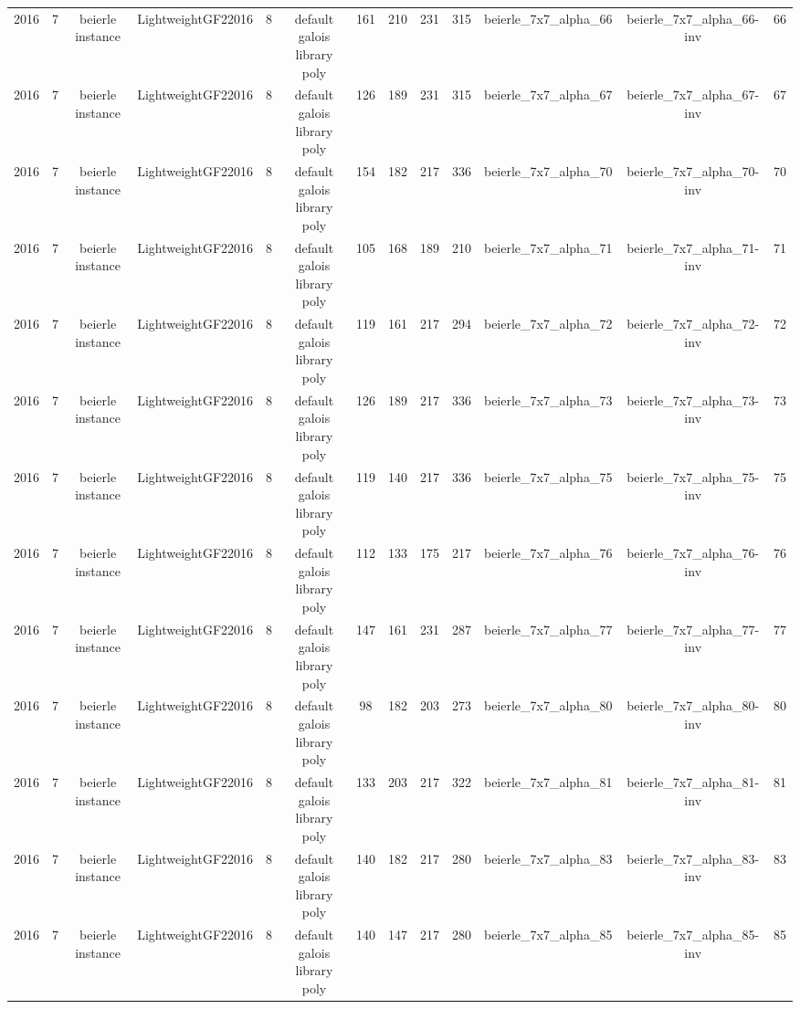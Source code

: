 \begin{tabular}{c c c c c c c c c c c c c}
2016 & 7 & beierle instance & LightweightGF22016 & 8 & default galois library poly & 161 & 210 & 231 & 315 & beierle_7x7_alpha_66 & beierle_7x7_alpha_66-inv & 66 \\
2016 & 7 & beierle instance & LightweightGF22016 & 8 & default galois library poly & 126 & 189 & 231 & 315 & beierle_7x7_alpha_67 & beierle_7x7_alpha_67-inv & 67 \\
2016 & 7 & beierle instance & LightweightGF22016 & 8 & default galois library poly & 154 & 182 & 217 & 336 & beierle_7x7_alpha_70 & beierle_7x7_alpha_70-inv & 70 \\
2016 & 7 & beierle instance & LightweightGF22016 & 8 & default galois library poly & 105 & 168 & 189 & 210 & beierle_7x7_alpha_71 & beierle_7x7_alpha_71-inv & 71 \\
2016 & 7 & beierle instance & LightweightGF22016 & 8 & default galois library poly & 119 & 161 & 217 & 294 & beierle_7x7_alpha_72 & beierle_7x7_alpha_72-inv & 72 \\
2016 & 7 & beierle instance & LightweightGF22016 & 8 & default galois library poly & 126 & 189 & 217 & 336 & beierle_7x7_alpha_73 & beierle_7x7_alpha_73-inv & 73 \\
2016 & 7 & beierle instance & LightweightGF22016 & 8 & default galois library poly & 119 & 140 & 217 & 336 & beierle_7x7_alpha_75 & beierle_7x7_alpha_75-inv & 75 \\
2016 & 7 & beierle instance & LightweightGF22016 & 8 & default galois library poly & 112 & 133 & 175 & 217 & beierle_7x7_alpha_76 & beierle_7x7_alpha_76-inv & 76 \\
2016 & 7 & beierle instance & LightweightGF22016 & 8 & default galois library poly & 147 & 161 & 231 & 287 & beierle_7x7_alpha_77 & beierle_7x7_alpha_77-inv & 77 \\
2016 & 7 & beierle instance & LightweightGF22016 & 8 & default galois library poly & 98 & 182 & 203 & 273 & beierle_7x7_alpha_80 & beierle_7x7_alpha_80-inv & 80 \\
2016 & 7 & beierle instance & LightweightGF22016 & 8 & default galois library poly & 133 & 203 & 217 & 322 & beierle_7x7_alpha_81 & beierle_7x7_alpha_81-inv & 81 \\
2016 & 7 & beierle instance & LightweightGF22016 & 8 & default galois library poly & 140 & 182 & 217 & 280 & beierle_7x7_alpha_83 & beierle_7x7_alpha_83-inv & 83 \\
2016 & 7 & beierle instance & LightweightGF22016 & 8 & default galois library poly & 140 & 147 & 217 & 280 & beierle_7x7_alpha_85 & beierle_7x7_alpha_85-inv & 85 \\

\end{tabular}
